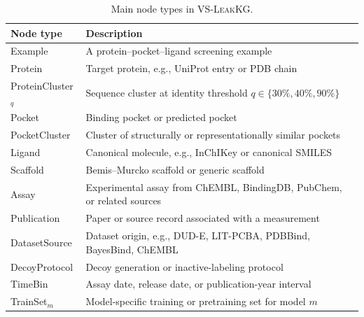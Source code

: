 \documentclass[11pt]{article}
\begin{document}
\begin{table}[h]
\centering
\caption{Main node types in \textsc{VS-LeakKG}.}
\label{tab:nodes}
\begin{tabular}{ll}
\toprule
\textbf{Node type} & \textbf{Description} \\
\midrule
Example & A protein--pocket--ligand screening example \\
Protein & Target protein, e.g., UniProt entry or PDB chain \\
ProteinCluster\(_q\) & Sequence cluster at identity threshold \(q\in\{30\%,40\%,90\%\}\) \\
Pocket & Binding pocket or predicted pocket \\
PocketCluster & Cluster of structurally or representationally similar pockets \\
Ligand & Canonical molecule, e.g., InChIKey or canonical SMILES \\
Scaffold & Bemis--Murcko scaffold or generic scaffold \\
Assay & Experimental assay from ChEMBL, BindingDB, PubChem, or related sources \\
Publication & Paper or source record associated with a measurement \\
DatasetSource & Dataset origin, e.g., DUD-E, LIT-PCBA, PDBBind, BayesBind, ChEMBL \\
DecoyProtocol & Decoy generation or inactive-labeling protocol \\
TimeBin & Assay date, release date, or publication-year interval \\
TrainSet\(_m\) & Model-specific training or pretraining set for model \(m\) \\
\bottomrule
\end{tabular}
\end{table}
\end{document}

